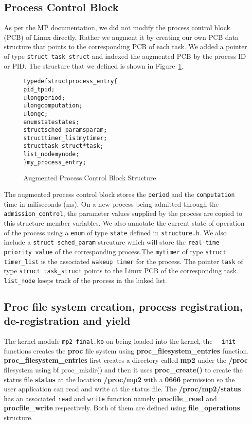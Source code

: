 
\subsection{Process Control Block}\label{subsec:pcb}

As per the MP documentation, we did not modify the process control block (PCB) of Linux directly. Rather we augment it by creating our own PCB data structure that points to the corresponding PCB of each task. We added a pointer of type {\tt struct task\_struct} and indexed the augmented PCB by the process ID or PID. The structure that we defined is shown in Figure~\ref{fig:PCB}.

\begin{figure}[h]
	\begin{alltt}
		typedef struct process\_entry \{
			\qquad pid\_t pid;		
			\qquad ulong period;	
			\qquad ulong computation;
			\qquad ulong c;
			\qquad enum state states;	
			\qquad struct sched\_param sparam;
			\qquad struct timer\_list mytimer;
			\qquad struct task\_struct *task;
			\qquad list\_node mynode;
		\} my\_process\_entry;
	\end{alltt}
	\caption{Augmented Process Control Block Structure\label{fig:PCB}}
\end{figure}

The augmented process control block stores the {\tt period} and the {\tt computation} time in miliseconds (ms). On a new process being admitted through the {\tt admission\_control}, the parameter values supplied by the process are copied to this structure member variables. We also annotate the current state of operation of the process using a {\tt enum} of type {\tt state} defined in {\tt structure.h}. We also include a {\tt struct sched\_param} strcuture which will store the {\tt real-time priority value} of the corresponding process.The {\tt mytimer} of type {\tt struct timer\_list} is the associated {\tt wakeup timer} for the process. The pointer {\tt task} of type {\tt struct task\_struct} points to the Linux PCB of the corresponding task. {\tt list\_node} keeps track of the process in the linked list.

\subsection{Proc file system creation, process registration, de-registration and yield}\label{subsec:Proc}

The kernel module {\tt mp2\_final.ko} on being loaded into the kernel, the {\tt \_\_init} functions creates the {\bf proc} file system using {\bf proc\_filesystem\_entries} function. {\bf proc\_filesystem\_entries} first creates a directory called {\bf mp2} under the {\bf /proc} filesystem using {bf proc\_mkdir()} and then it uses {\bf proc\_create()} to create the status file {\bf status} at the location {\bf /proc/mp2} with a {\bf 0666} permission so the user application can read and write at the status file. The {\bf /proc/mp2/status} has an associated {\tt read} and {\tt write} function namely {\bf procfile\_read} and {\bf procfile\_write} respectively. Both of them are defined using {\bf file\_operations} structure.

